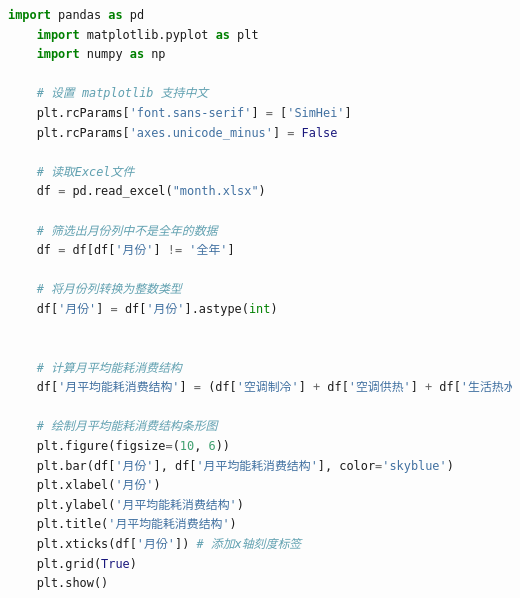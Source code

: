 \documentclass[UTF8]{ctexart}
\begin{document}
    \begin{lstlisting}[language=Python]
    import pandas as pd
    import matplotlib.pyplot as plt
    import numpy as np

    # 设置 matplotlib 支持中文
    plt.rcParams['font.sans-serif'] = ['SimHei']
    plt.rcParams['axes.unicode_minus'] = False

    # 读取Excel文件
    df = pd.read_excel("month.xlsx")    

    # 筛选出月份列中不是全年的数据
    df = df[df['月份'] != '全年']

    # 将月份列转换为整数类型
    df['月份'] = df['月份'].astype(int)


    # 计算月平均能耗消费结构
    df['月平均能耗消费结构'] = (df['空调制冷'] + df['空调供热'] + df['生活热水']) / df['电力']

    # 绘制月平均能耗消费结构条形图
    plt.figure(figsize=(10, 6))
    plt.bar(df['月份'], df['月平均能耗消费结构'], color='skyblue')
    plt.xlabel('月份')
    plt.ylabel('月平均能耗消费结构')
    plt.title('月平均能耗消费结构')
    plt.xticks(df['月份']) # 添加x轴刻度标签
    plt.grid(True)
    plt.show()
\end{lstlisting}
\end{document}
